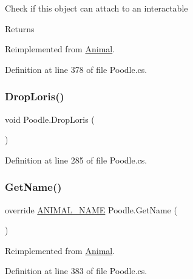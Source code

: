 Check if this object can attach to an interactable 

\begin{DoxyReturn}{Returns}

\end{DoxyReturn}


Reimplemented from \mbox{\hyperlink{class_animal_a4809045a8807c4b2e0d7569b806740ee}{Animal}}.



Definition at line 378 of file Poodle.\+cs.

\mbox{\label{class_poodle_a5e80c74cffb2d8235abf064eb729bfec}} 
\subsubsection{\texorpdfstring{Drop\+Loris()}{DropLoris()}}
{\footnotesize\ttfamily void Poodle.\+Drop\+Loris (\begin{DoxyParamCaption}{ }\end{DoxyParamCaption})}



Definition at line 285 of file Poodle.\+cs.

\mbox{\label{class_poodle_a4aa6f80707dff1497fa00f855e28435e}} 
\subsubsection{\texorpdfstring{Get\+Name()}{GetName()}}
{\footnotesize\ttfamily override \mbox{\hyperlink{_animal_8cs_a2fa5713399b84d1b88dae9196837af50}{A\+N\+I\+M\+A\+L\+\_\+\+N\+A\+ME}} Poodle.\+Get\+Name (\begin{DoxyParamCaption}{ }\end{DoxyParamCaption})\hspace{0.3cm}{\ttfamily [virtual]}}



Reimplemented from \mbox{\hyperlink{class_animal_ab66ea3e3cb15a2b236ba9ba4d589ca69}{Animal}}.



Definition at line 383 of file Poodle.\+cs.

\mbox{\label{class_poodle_ac1de5bc05d00449271365b51f90ef80f}} 
